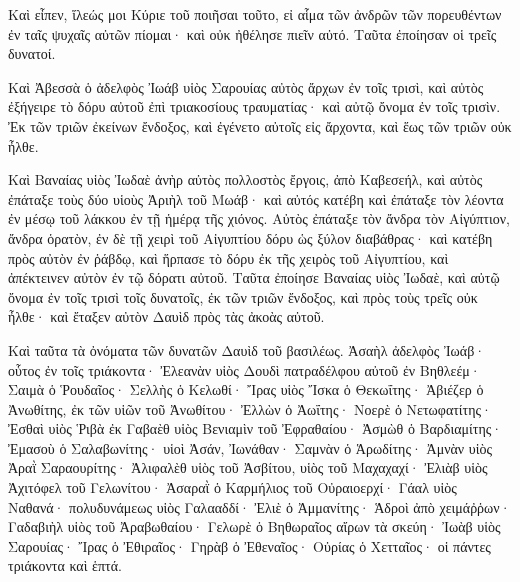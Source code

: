 {Καὶ εἶπεν, ἵλεώς μοι Κύριε τοῦ ποιῆσαι τοῦτο, εἰ αἷμα τῶν ἀνδρῶν τῶν πορευθέντων ἐν ταῖς ψυχαῖς αὐτῶν πίομαι· καὶ οὐκ ἠθέλησε πιεῖν αὐτό. Ταῦτα ἐποίησαν οἱ τρεῖς δυνατοί.
\par }{\PP {}Καὶ Ἀβεσσὰ ὁ ἀδελφὸς Ἰωάβ υἱὸς Σαρουίας αὐτὸς ἄρχων ἐν τοῖς τρισὶ, καὶ αὐτὸς ἐξήγειρε τὸ δόρυ αὐτοῦ ἐπὶ τριακοσίους τραυματίας· καὶ αὐτῷ ὄνομα ἐν τοῖς τρισὶν.
Ἐκ τῶν τριῶν ἐκείνων ἔνδοξος, καὶ ἐγένετο αὐτοῖς εἰς ἄρχοντα, καὶ ἕως τῶν τριῶν οὐκ ἦλθε.
\par }{\PP {}Καὶ Βαναίας υἱὸς Ἰωδαὲ ἀνὴρ αὐτὸς πολλοστὸς ἔργοις, ἀπὸ Καβεσεήλ, καὶ αὐτὸς ἐπάταξε τοὺς δύο υἱοὺς Ἀριὴλ τοῦ Μωάβ· καὶ αὐτός κατέβη καὶ ἐπάταξε τὸν λέοντα ἐν μέσῳ τοῦ λάκκου ἐν τῇ ἡμέρᾳ τῆς χιόνος.
Αὐτὸς ἐπάταξε τὸν ἄνδρα τὸν Αἰγύπτιον, ἄνδρα ὁρατὸν, ἐν δὲ τῇ χειρὶ τοῦ Αἰγυπτίου δόρυ ὡς ξύλον διαβάθρας· καὶ κατέβη πρὸς αὐτὸν ἐν ῥάβδῳ, καὶ ἥρπασε τὸ δόρυ ἐκ τῆς χειρὸς τοῦ Αἰγυπτίου, καὶ ἀπέκτεινεν αὐτὸν ἐν τῷ δόρατι αὐτοῦ.
Ταῦτα ἐποίησε Βαναίας υἱὸς Ἰωδαὲ, καὶ αὐτῷ ὄνομα ἐν τοῖς τρισὶ τοῖς δυνατοῖς,
ἐκ τῶν τριῶν ἔνδοξος, καὶ πρὸς τοὺς τρεῖς οὐκ ἦλθε· καὶ ἔταξεν αὐτὸν Δαυὶδ πρὸς τὰς ἀκοὰς αὐτοῦ.
\par }{\PP Καὶ ταῦτα τὰ ὀνόματα τῶν δυνατῶν Δαυὶδ τοῦ βασιλέως.
Ἀσαὴλ ἀδελφὸς Ἰωάβ· οὗτος ἐν τοῖς τριάκοντα· Ἐλεανὰν υἱὸς Δουδὶ πατραδέλφου αὐτοῦ ἐν Βηθλεέμ·
Σαιμὰ ὁ Ῥουδαῖος·
Σελλὴς ὁ Κελωθί· Ἴρας υἱὸς Ἴσκα ὁ Θεκωΐτης·
Ἀβιέζερ ὁ Ἀνωθίτης, ἐκ τῶν υἱῶν τοῦ Ἀνωθίτου·
Ἐλλὼν ὁ Ἀωΐτης· Νοερὲ ὁ Νετωφατίτης·
Ἐσθαὶ υἱὸς Ῥιβὰ ἐκ Γαβαὲθ υἱὸς Βενιαμὶν τοῦ Ἐφραθαίου· Ἀσμὼθ ὁ Βαρδιαμίτης·
Ἐμασοὺ ὁ Σαλαβωνίτης· υἱοὶ Ἀσάν, Ἰωνάθαν·
Σαμνὰν ὁ Ἁρωδίτης· Ἀμνὰν υἱὸς Ἀραῒ Σαραουρίτης·
Ἀλιφαλὲθ υἱὸς τοῦ Ἀσβίτου, υἱὸς τοῦ Μαχαχαχί· Ἐλιὰβ υἱὸς Ἀχιτόφελ τοῦ Γελωνίτου·
Ἀσαραῒ ὁ Καρμήλιος τοῦ Οὐραιοερχί·
Γάαλ υἱὸς Ναθανά· πολυδυνάμεως υἱὸς Γαλααδδί·
Ἐλιὲ ὁ Ἀμμανίτης·
Ἁδροὶ ἀπὸ χειμάῤῥων·
Γαδαβιὴλ υἱὸς τοῦ Ἀραβωθαίου·
Γελωρὲ ὁ Βηθωραῖος αἴρων τὰ σκεύη· Ἰωὰβ υἱὸς Σαρουίας·
Ἴρας ὁ Ἐθιραῖος· Γηρὰβ ὁ Ἐθεναῖος·
Οὐρίας ὁ Χετταῖος· οἱ πάντες τριάκοντα καὶ ἑπτά.

}
